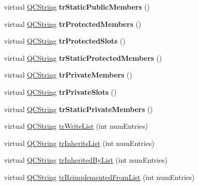 \begin{DoxyCompactItemize}
virtual \mbox{\hyperlink{class_q_c_string}{Q\+C\+String}} {\bfseries tr\+Static\+Public\+Members} ()
\item 
\mbox{\label{class_translator_arabic_ab8712584fb25c39ce8c476aedfc0adbd}} 
virtual \mbox{\hyperlink{class_q_c_string}{Q\+C\+String}} {\bfseries tr\+Protected\+Members} ()
\item 
\mbox{\label{class_translator_arabic_a93207e94befef764a2152e7b5968bcd1}} 
virtual \mbox{\hyperlink{class_q_c_string}{Q\+C\+String}} {\bfseries tr\+Protected\+Slots} ()
\item 
\mbox{\label{class_translator_arabic_adcd035f442320c1ac2bc2252ee5af778}} 
virtual \mbox{\hyperlink{class_q_c_string}{Q\+C\+String}} {\bfseries tr\+Static\+Protected\+Members} ()
\item 
\mbox{\label{class_translator_arabic_aab9514df0e4b2d87ebe84285dc39faef}} 
virtual \mbox{\hyperlink{class_q_c_string}{Q\+C\+String}} {\bfseries tr\+Private\+Members} ()
\item 
\mbox{\label{class_translator_arabic_a1e14883fe9d6ae0337d1b6331decb470}} 
virtual \mbox{\hyperlink{class_q_c_string}{Q\+C\+String}} {\bfseries tr\+Private\+Slots} ()
\item 
\mbox{\label{class_translator_arabic_ae163b07dd2f1c473cca948e85c719bda}} 
virtual \mbox{\hyperlink{class_q_c_string}{Q\+C\+String}} {\bfseries tr\+Static\+Private\+Members} ()
\item 
virtual \mbox{\hyperlink{class_q_c_string}{Q\+C\+String}} \mbox{\hyperlink{class_translator_arabic_ae18e9a21f88b459c24099e2517ba10d8}{tr\+Write\+List}} (int num\+Entries)
\item 
virtual \mbox{\hyperlink{class_q_c_string}{Q\+C\+String}} \mbox{\hyperlink{class_translator_arabic_addbed4b78219a76378934b026c78e0cd}{tr\+Inherits\+List}} (int num\+Entries)
\item 
virtual \mbox{\hyperlink{class_q_c_string}{Q\+C\+String}} \mbox{\hyperlink{class_translator_arabic_a1f08fac4cb3e1a2956cf4646af2b1a01}{tr\+Inherited\+By\+List}} (int num\+Entries)
\item 
virtual \mbox{\hyperlink{class_q_c_string}{Q\+C\+String}} \mbox{\hyperlink{class_translator_arabic_af3bc590702619fc2294ce4ca0f27721a}{tr\+Reimplemented\+From\+List}} (int num\+Entries)

\end{DoxyCompactItemize}
